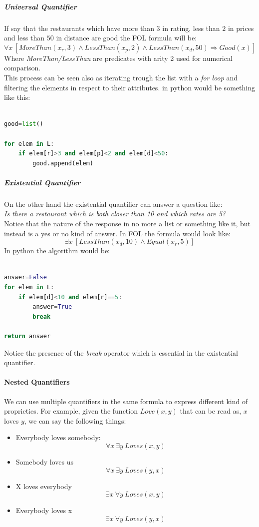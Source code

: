 \documentclass[10pt,a4paper]{article}
\begin{document}
\subparagraph{Universal Quantifier} 
If say that the restaurants which have more than $3$ in rating, less than $2$ in prices and less than $50$ in distance are good the FOL formula will be:
\[\forall x\ [MoreThan(x_r,3) \wedge LessThan(x_p,2) \wedge LessThan(x_d,50) \Rightarrow Good(x)]\]
Where \textit{MoreThan/LessThan} are predicates with arity 2 used for numerical comparison.\\
This process can be seen also as iterating trough the list with a \textit{for loop} and filtering the elements in respect to their attributes. in python would be something like this:
\begin{lstlisting}[language=Python]

good=list()

for elem in L:
	if elem[r]>3 and elem[p]<2 and elem[d]<50:
		good.append(elem)

\end{lstlisting}

\subparagraph{Existential Quantifier} 
On the other hand the existential quantifier can answer a question like:\\
\textit{Is there a restaurant which is both closer than 10 and which rates are 5?}\\
Notice that the nature of the response in no more a list or something like it, but instead is a yes or no kind of answer. In FOL the formula would look like:
\[\exists x\ [LessThan(x_d,10) \wedge Equal(x_r,5)]\]
In python the algorithm would be:
\begin{lstlisting}[language=Python]

answer=False
for elem in L:
	if elem[d]<10 and elem[r]==5:
		answer=True
		break
		
return answer

\end{lstlisting}
Notice the presence of the \textit{break} operator which is essential in the existential quantifier.




\paragraph{Nested Quantifiers}
We can use multiple quantifiers in the same formula to express different kind of proprieties. For example, given the function $Love(x,y)$ that can be read as, $x$ loves $y$, we can say the following things:
\begin{itemize}
\item Everybody loves somebody:
\[\forall x\ \exists y\ Loves(x,y)\]
\item Somebody loves us
\[\forall x\ \exists y\ Loves(y,x)\]
\item X loves everybody
\[\exists x\ \forall y\ Loves(x,y)\]
\item Everybody loves x
\[\exists x\ \forall y\ Loves(y,x)\]
\end{itemize}
\end{document}
